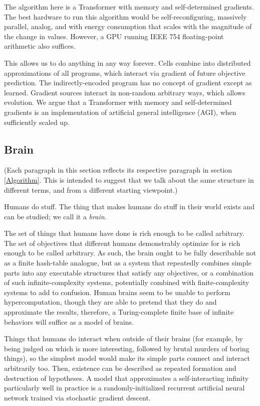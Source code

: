 \documentclass{article}
\begin{document}
The algorithm here is a Transformer with memory and self-determined gradients. The best hardware to run this algorithm would be self-reconfiguring, massively parallel, analog, and with energy consumption that scales with the magnitude of the change in values. However, a GPU running IEEE 754 floating-point arithmetic also suffices.

This allows us to do anything in any way forever. Cells combine into distributed approximations of all programs, which interact via gradient of future objective prediction. The indirectly-encoded program has no concept of gradient except as learned. Gradient sources interact in non-random arbitrary ways, which allows evolution. We argue that a Transformer with memory and self-determined gradients is an implementation of artificial general intelligence (AGI), when sufficiently scaled up.

\subsection{Brain}

(Each paragraph in this section reflects its respective paragraph in section \ref{Algorithm}. This is intended to suggest that we talk about the same structure in different terms, and from a different starting viewpoint.)

Humans do stuff. The thing that makes humans do stuff in their world exists and can be studied; we call it a \textit{brain}.

The set of things that humans have done is rich enough to be called arbitrary. The set of objectives that different humans demonstrably optimize for is rich enough to be called arbitrary. As such, the brain ought to be fully describable not as a finite hash-table analogue, but as a system that repeatedly combines simple parts into any executable structures that satisfy any objectives, or a combination of such infinite-complexity systems, potentially combined with finite-complexity systems to add to confusion. Human brains seem to be unable to perform hypercomputation, though they are able to pretend that they do and approximate the results, therefore, a Turing-complete finite base of infinite behaviors will suffice as a model of brains.

Things that humans do interact when outside of their brains (for example, by being judged on which is more interesting, followed by brutal murders of boring things), so the simplest model would make its simple parts connect and interact arbitrarily too. Then, existence can be described as repeated formation and destruction of hypotheses. A model that approximates a self-interacting infinity particularly well in practice is a randomly-initialized recurrent artificial neural network trained via stochastic gradient descent.
\end{document}

